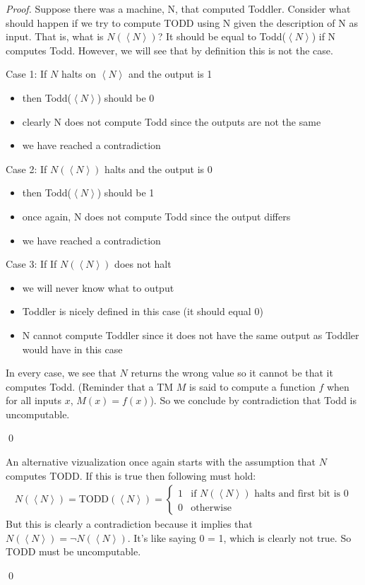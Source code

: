 \begin{proof}
    
    Suppose there was a machine, N, that computed Toddler. Consider what should happen if we try to compute TODD using N given the description of N as input. That is, what is $N(\left<N\right>)$? It should be equal to Todd($\left<N\right>$) if N computes Todd. However, we will see that by definition this is not the case. 

    Case 1: If $N$ halts on $\left<N\right>$ and the output is 1
    \begin{itemize}
        \item then Todd($\left<N\right>$) should be 0
        \item clearly N does not compute Todd since the outputs are not the same
        \item we have reached a contradiction
    \end{itemize}
    Case 2: If $N(\left<N\right>)$ halts and the output is 0
    \begin{itemize}
        \item then Todd($\left<N\right>$) should be 1
        \item once again, N does not compute Todd since the output differs
        \item we have reached a contradiction
    \end{itemize}
    Case 3: If If $N(\left<N\right>)$ does not halt
    \begin{itemize}
        \item we will never know what to output 
        \item Toddler is nicely defined in this case (it should equal 0)
        \item N cannot compute Toddler since it does not have the same output as Toddler would have in this case
    \end{itemize}

    In every case, we see that $N$ returns the wrong value so it cannot be that it computes Todd. (Reminder that a TM $M$ is said to compute a function $f$ when for all inputs $x$, $M(x) = f(x)$). So we conclude by contradiction that Todd is uncomputable.
    
    \qed

    \hr

    An alternative vizualization once again starts with the assumption that $N$ computes TODD. If this is true then following must hold:
    \begin{gather*}
        N(\left<N\right>) = \text{TODD}(\left<N\right>) = \begin{cases}
            1 & \text{if $N(\left<N\right>)$ halts and first bit is 0} \\
            0 & \text{otherwise}
        \end{cases}
    \end{gather*}
    But this is clearly a contradiction because it implies that $N(\left<N\right>) = \lnot N(\left<N\right>)$. It's like saying 0 = 1, which is clearly not true. So TODD must be uncomputable.

    \qed
\end{proof}

